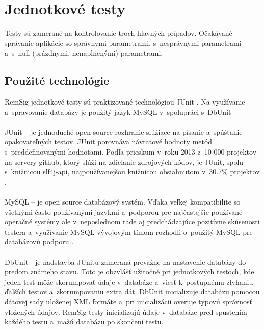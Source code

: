 \documentclass[
  digital, %
  table,   %
oneside,
  nolof,     %
  nolot,     %
]{fithesis3}
\begin{document}
\section{Jednotkové testy}
Testy sú zamerané na kontrolovanie troch hlavných prípadov. Očakávané správanie aplikácie so správnymi parametrami, s~nesprávnymi parametrami a~s~null (prázdnymi, nenaplnenými) parametrami.
\subsection{Použité technológie}
RemSig jednotkové testy sú praktizované technológiou  JUnit \cite{junit}. Na využívanie a~spravovanie databázy je použitý jazyk MySQL v~spolupráci s~DbUnit \cite{dbunit}\paragraph{}
JUnit – je jednoduché open source rozhranie slúžiace na písanie a~spúšťanie opakovateľných testov. JUnit porovnáva návratové hodnoty metód s~preddefinovanými hodnotami. Podľa prieskum v~roku 2013 z~10 000 projektov na servery github, ktorý slúži na zdieľanie zdrojových kódov, je JUnit, spolu s~knižnicou slf4j-api, najpoužívanejšou knižnicou obsiahnutom v~30.7\% projektov \cite{gitHubAnalysis}. \paragraph{}
MySQL – je open source databázový systém. Vďaka veľkej kompatibilite so všetkými často používanými jazykmi a~podporou pre najčastejšie používané operačné systémy ale v~neposlednom rade aj predchádzajúce pozitívne skúsenosti testera a~využívanie MySQL vývojovým tímom rozhodli o~použitý MySQL pre databázovú podporu \cite{mySqlBible}.\paragraph{}
DbUnit -  je nadstavba JUnitu zameraná prevažne na nastavenie databázy do predom známeho stavu. Toto je obzvlášť užitočné pri jednotkových testoch, kde jeden test môže skorumpovať údaje v~databáze a~viesť k~postupnému zlyhaniu ďalších  testov a~zkorumpovaniu extra dát. DbUnit inicializuje databázu pomocou  dátovej sady uloženej XML formáte a~pri inicializácii overuje typovú správnosť vložených údajov. RemSig testy inicializujú údaje v~databáze pred  spustením  každého testu a~mažú databázu po skončení testu.  
\end{document}
